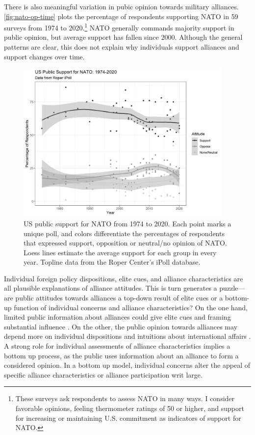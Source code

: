 \documentclass[12pt]{article}
\begin{document}
There is also meaningful variation in pubic opinion towards military alliances. 
\autoref{fig:nato-op-time} plots the percentage of respondents supporting NATO in 59 surveys from 1974 to 2020.\footnote{These surveys ask respondents to assess NATO in many ways. I consider favorable opinions, feeling thermometer ratings of 50 or higher, and support for increasing or maintaining U.S. commitment as indicators of support for NATO.} 
NATO generally commands majority support in public opinion, but average support has fallen since 2000. 
Although the general patterns are clear, this does not explain why individuals support alliances and support changes over time. 


\begin{figure}
	\centering
		\includegraphics[width=0.95\textwidth]{../figures/nato-op-time.png}
	\caption{US public support for NATO from 1974 to 2020. Each point marks a unique poll, and colors differentiate the percentages of respondents that expressed support, opposition or neutral/no opinion of NATO. Loess lines estimate the average support for each group in every year. Topline data from the Roper Center's iPoll database.}
	\label{fig:nato-op-time}
\end{figure}


Individual foreign policy dispositions, elite cues, and alliance characteristics are all plausible explanations of alliance attitudes.
This is turn generates a puzzle--- are public attitudes towards alliances a top-down result of elite cues or a bottom-up function of individual concerns and alliance characteristics? 
On the one hand, limited public information about alliances could give elite cues and framing substantial influence \citep{Druckman2001}. 
On the other, the public opinion towards alliances may depend more on individual dispositions and intuitions about international affairs \citep{KertzerZeitzoff2017}.
A strong role for individual assessments of alliance characteristics implies a bottom up process, as the public uses information about an alliance to form a considered opinion.
In a bottom up model, individual concerns alter the appeal of specific alliance characteristics or alliance participation writ large.  
\end{document}
